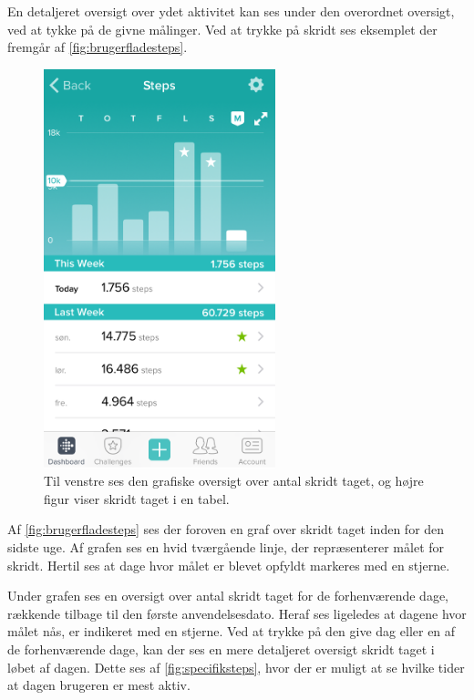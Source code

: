 En detaljeret oversigt over ydet aktivitet kan ses under den overordnet oversigt, ved at tykke på de givne målinger. Ved at trykke på skridt ses eksemplet der fremgår af \autoref{fig:brugerfladesteps}.  

\begin{figure}[H]
	\centering
	\includegraphics[width=0.6\textwidth]{figures/brugerfladesteps}
	\caption{Til venstre ses den grafiske oversigt over antal skridt taget, og højre figur viser skridt taget i en tabel.}
	\label{fig:brugerfladesteps}
\end{figure}

Af \autoref{fig:brugerfladesteps} ses der foroven en graf over skridt taget inden for den sidste uge. Af grafen ses en hvid tværgående linje, der repræsenterer målet for skridt. Hertil ses at dage hvor målet er blevet opfyldt markeres med en stjerne.  

Under grafen ses en oversigt over antal skridt taget for de forhenværende dage, rækkende tilbage til den første anvendelsesdato. Heraf ses ligeledes at dagene hvor målet nås, er indikeret med en stjerne. Ved at trykke på den give dag eller en af de forhenværende dage, kan der ses en mere detaljeret oversigt skridt taget i løbet af dagen. Dette ses af \autoref{fig:specifiksteps}, hvor der er muligt at se hvilke tider at dagen brugeren er mest aktiv.  

